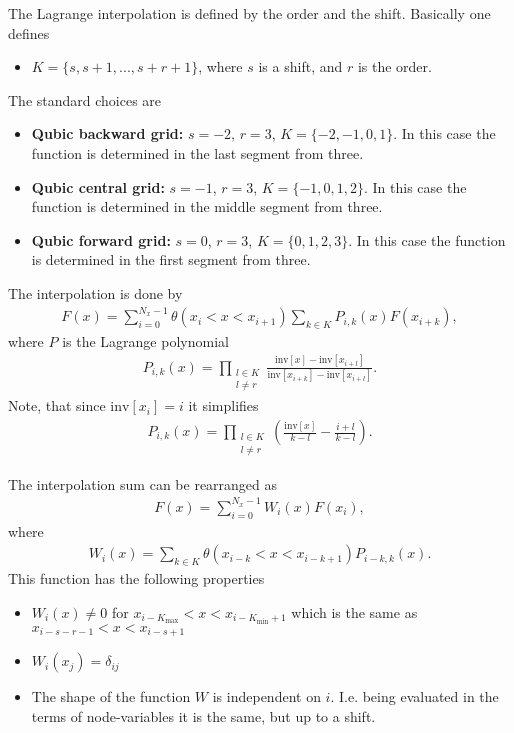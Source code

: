 \documentclass[prd,nofootinbib,eqsecnum,final]{revtex4}
\renewcommand{\(}{\left(}
\renewcommand{\)}{\right)}
\renewcommand{\[}{\left[}
\renewcommand{\]}{\right]}
\begin{document}
The Lagrange interpolation is defined by the order and the shift. Basically one defines
\begin{itemize}
\item $K=\{s,s+1,...,s+r+1\}$, where $s$ is a shift, and $r$ is the order.
\end{itemize}
The standard choices are
\begin{itemize}
\item \textbf{Qubic backward grid:} $s=-2$, $r=3$, $K=\{-2,-1,0,1\}$. In this case the function is determined in the last segment from three.
\item \textbf{Qubic central grid:} $s=-1$, $r=3$, $K=\{-1,0,1,2\}$. In this case the function is determined in the middle segment from three.
\item \textbf{Qubic forward grid:} $s=0$, $r=3$, $K=\{0,1,2,3\}$. In this case the function is determined in the first segment from three.
\end{itemize}
The interpolation is done by
\begin{eqnarray}
F(x)=\sum_{i=0}^{N_x-1}\theta(x_i<x<x_{i+1})\sum_{k\in K} P_{i,k}(x)F(x_{i+k}),
\end{eqnarray}
where $P$ is the Lagrange polynomial
\begin{eqnarray}
P_{i,k}(x)
=\prod_{\substack{l\in K\\ l\neq r}}\frac{\text{inv}[x]-\text{inv}[x_{i+l}]}{\text{inv}[x_{i+k}]-\text{inv}[x_{i+l}]}.
\end{eqnarray}
Note, that since $\text{inv}[x_{i}]=i$ it simplifies
\begin{eqnarray}
P_{i,k}(x)
=\prod_{\substack{l\in K\\ l\neq r}}\(\frac{\text{inv}[x]}{k-l}-\frac{i+l}{k-l}\).
\end{eqnarray}

The interpolation sum can be rearranged as
\begin{eqnarray}
F(x)=\sum_{i=0}^{N_x-1}W_i(x)F(x_{i}),
\end{eqnarray}
where
\begin{eqnarray}
W_i(x)=\sum_{k\in K}\theta(x_{i-k}<x<x_{i-k+1})P_{i-k,k}(x).
\end{eqnarray}
This function has the following properties
\begin{itemize}
\item $W_i(x)\neq 0$ for $x_{i-K_\text{max}}<x<x_{i-K_\text{min}+1}$ which is the same as 
$x_{i-s-r-1}<x<x_{i-s+1}$
\item $W_i(x_j)=\delta_{ij}$
\item The shape of the function $W$ is independent on $i$. I.e. being evaluated in the terms of node-variables it is the same, but up to a shift.
\end{itemize}
\end{document}
